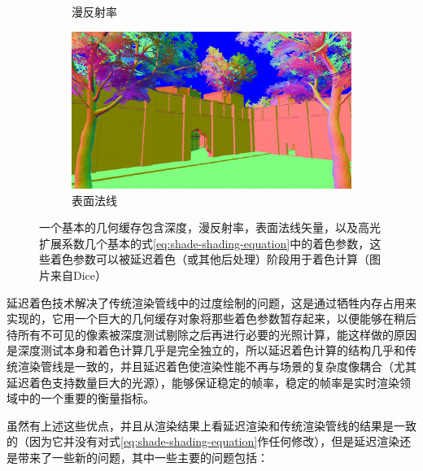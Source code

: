 \begin{figure}
\begin{fullwidth}
\begin{subfigure}[b]{0.24\thewidth}
		\caption{漫反射率}
	\end{subfigure}
	\begin{subfigure}[b]{0.24\thewidth}
		\includegraphics[width=1.\textwidth]{figures/shade/g-buffer-normal}
		\caption{表面法线}
	\end{subfigure}
\caption{一个基本的几何缓存包含深度，漫反射率，表面法线矢量，以及高光扩展系数几个基本的式\ref{eq:shade-shading-equation}中的着色参数，这些着色参数可以被延迟着色（或其他后处理）阶段用于着色计算（图片来自Dice）}
\label{f:shade-g-buffer}
\end{fullwidth}
\end{figure}

延迟着色技术解决了传统渲染管线中的过度绘制的问题，这是通过牺牲内存占用来实现的，它用一个巨大的几何缓存对象将那些着色参数暂存起来，以便能够在稍后待所有不可见的像素被深度测试剔除之后再进行必要的光照计算，能这样做的原因是深度测试本身和着色计算几乎是完全独立的，所以延迟着色计算的结构几乎和传统渲染管线是一致的，并且延迟着色使渲染性能不再与场景的复杂度像耦合（尤其延迟着色支持数量巨大的光源），能够保证稳定的帧率，稳定的帧率是实时渲染领域中的一个重要的衡量指标。

虽然有上述这些优点，并且从渲染结果上看延迟渲染和传统渲染管线的结果是一致的（因为它并没有对式\ref{eq:shade-shading-equation}作任何修改），但是延迟渲染还是带来了一些新的问题，其中一些主要的问题包括：

